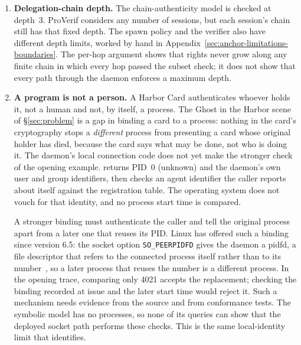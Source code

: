 \documentclass[11pt,a4paper]{article}
\theoremstyle{definition}
\begin{document}
\begin{enumerate}
  \item \textbf{Delegation-chain depth.} The chain-authenticity model is
  checked at depth~3. ProVerif considers any number of sessions, but each
  session's chain still has that fixed depth. The spawn policy and the
  verifier also have different depth limits, worked by hand in
  Appendix~\ref{sec:anchor-limitations-boundaries}. The per-hop argument shows
  that rights never grow along any finite chain in which every hop passed the
  subset check; it does not show that every
  path through the daemon enforces a maximum depth.
  \item \textbf{A program is not a person.} A Harbor Card authenticates whoever holds it, not a human and not, by itself, a process. The Ghost in the Harbor scene of \S\ref{sec:problem} is a gap in binding a card to a process: nothing in the card's cryptography stops a \emph{different} process from presenting a card whose original holder has died, because the card says what may be done, not who is doing it. The daemon's local connection code does not yet make the stronger check of the
opening example.  returns PID~0 (unknown) and the daemon's
own user and group identifiers, then checks an agent identifier the caller
reports about itself against the registration table. The operating system does
not vouch for that identity, and no process start time is compared.

A stronger binding must authenticate the caller and tell the original process
apart from a later one that reuses its PID. Linux has offered such a binding
since version 6.5: the socket option \texttt{SO\_PEERPIDFD} gives the daemon a
pidfd, a file descriptor that refers to the connected process itself rather
than to its number~, so a later process that reuses
the number is a different process. In the opening trace,
comparing only 4021 accepts the replacement; checking the binding recorded at
issue and the later start time would reject it. Such a mechanism needs
evidence from the source and from conformance tests. The symbolic model has no
processes, so none of its queries can show that the deployed socket path
performs these checks. This is the same local-identity limit that
 identifies.


\end{enumerate}
\end{document}
